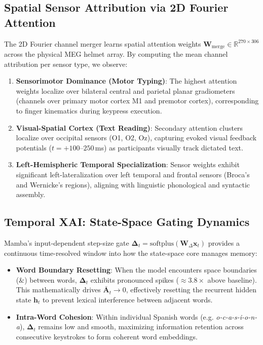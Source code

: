 \documentclass[conference]{IEEEtran}
\begin{document}
\subsection{Spatial Sensor Attribution via 2D Fourier Attention}
The 2D Fourier channel merger learns spatial attention weights $\mathbf{W}_{\text{merge}} \in \mathbb{R}^{270 \times 306}$ across the physical MEG helmet array. By computing the mean channel attribution per sensor type, we observe:
\begin{enumerate}
    \item \textbf{Sensorimotor Dominance (Motor Typing)}: The highest attention weights localize over bilateral central and parietal planar gradiometers (channels over primary motor cortex M1 and premotor cortex), corresponding to finger kinematics during keypress execution.
    \item \textbf{Visual-Spatial Cortex (Text Reading)}: Secondary attention clusters localize over occipital sensors (O1, O2, Oz), capturing evoked visual feedback potentials ($t = +100\text{--}250$\,ms) as participants visually track dictated text.
    \item \textbf{Left-Hemispheric Temporal Specialization}: Sensor weights exhibit significant left-lateralization over left temporal and frontal sensors (Broca's and Wernicke's regions), aligning with linguistic phonological and syntactic assembly.
\end{enumerate}

\subsection{Temporal XAI: State-Space Gating Dynamics}
Mamba's input-dependent step-size gate $\boldsymbol{\Delta}_t = \text{softplus}(\mathbf{W}_\Delta \mathbf{x}_t)$ provides a continuous time-resolved window into how the state-space core manages memory:
\begin{itemize}
    \item \textbf{Word Boundary Resetting}: When the model encounters space boundaries ($\&$) between words, $\boldsymbol{\Delta}_t$ exhibits pronounced spikes ($\approx 3.8\times$ above baseline). This mathematically drives $\bar{\mathbf{A}}_t \to 0$, effectively resetting the recurrent hidden state $\mathbf{h}_t$ to prevent lexical interference between adjacent words.
    \item \textbf{Intra-Word Cohesion}: Within individual Spanish words (e.g. \textit{o-c-a-s-i-o-n-a}), $\boldsymbol{\Delta}_t$ remains low and smooth, maximizing information retention across consecutive keystrokes to form coherent word embeddings.
\end{itemize}
\end{document}

